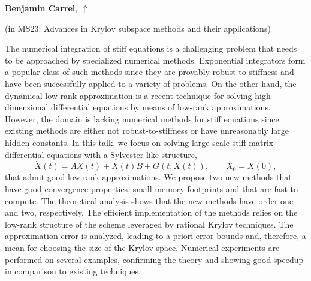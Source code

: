 \documentclass[ILAS2025-program.tex]{subfiles}
\begin{document}
\hypertarget{down0195}{}\begin{ilasabstract}
    
\textbf{Benjamin Carrel},  \hfill \hyperlink{up0195}{$\Uparrow$}
    
    
(in {\color{mstitle}MS23: Advances in Krylov subspace methods and their applications})
        
\mtskip
    The numerical integration of stiff equations is a challenging problem that needs to be approached by specialized numerical methods. Exponential integrators form a popular class of such methods since they are provably robust to stiffness and have been successfully applied to a variety of problems. On the other hand, the dynamical low-rank approximation is a recent technique for solving high-dimensional differential equations by means of low-rank approximations. However, the domain is lacking numerical methods for stiff equations since existing methods are either not robust-to-stiffness or have unreasonably large hidden constants. \newline
In this talk, we focus on solving large-scale stiff matrix differential equations with a Sylvester-like structure,
$$\dot{X}(t) = AX(t) + X(t)B + G(t,X(t)), \qquad X_0=X(0),$$
that admit good low-rank approximations. We propose two new methods that have good convergence properties, small memory footprints and that are fast to compute. The theoretical analysis shows that the new methods have order one and two, respectively. The efficient implementation of the methods relies on the low-rank structure of the scheme leveraged by rational Krylov techniques. The approximation error is analyzed, leading to a priori error bounds and, therefore, a mean for choosing the size of the Krylov space. Numerical experiments are performed on several examples, confirming the theory and showing good speedup in comparison to existing techniques.

\end{ilasabstract}
    
\end{document}
